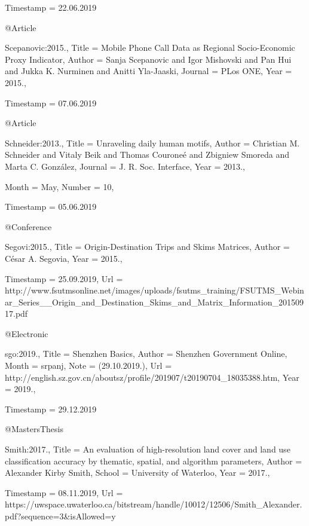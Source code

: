 {{{{  Timestamp                = {22.06.2019}
}

@Article{Scepanovic:2015.,
  Title                    = {{Mobile Phone Call Data as Regional Socio-Economic Proxy Indicator}},
  Author                   = {Sanja Scepanovic and Igor Mishovski and Pan Hui and Jukka K. Nurminen and Anitti Yla-Jaaski},
  Journal                  = {PLos ONE},
  Year                     = {2015.},

  Timestamp                = {07.06.2019}
}

@Article{Schneider:2013.,
  Title                    = {Unraveling daily human motifs},
  Author                   = {Christian M. Schneider and Vitaly Beik and Thomas Courone\'e and Zbigniew Smoreda and Marta C. Gonz\'alez},
  Journal                  = {J. R. Soc. Interface},
  Year                     = {2013.},

  Month                    = {May},
  Number                   = {10},

  Timestamp                = {05.06.2019}
}

@Conference{Segovi:2015.,
  Title                    = {{Origin-Destination Trips and Skims Matrices}},
  Author                   = {C\'esar A. Segovia},
  Year                     = {2015.},

  Timestamp                = {25.09.2019},
  Url                      = {http://www.fsutmsonline.net/images/uploads/fsutms_training/FSUTMS_Webinar_Series__Origin_and_Destination_Skims_and_Matrix_Information_20150917.pdf}
}

@Electronic{sgo:2019.,
  Title                    = {Shenzhen Basics},
  Author                   = {{Shenzhen Government Online}},
  Month                    = {srpanj},
  Note                     = {(29.10.2019.)},
  Url                      = {http://english.sz.gov.cn/aboutsz/profile/201907/t20190704_18035388.htm},
  Year                     = {2019.},

  Timestamp                = {29.12.2019}
}

@MastersThesis{Smith:2017.,
  Title                    = {An evaluation of high-resolution land cover and land use classification accuracy by thematic, spatial, and algorithm parameters},
  Author                   = {Alexander Kirby Smith},
  School                   = {University of Waterloo},
  Year                     = {2017.},

  Timestamp                = {08.11.2019},
  Url                      = {https://uwspace.uwaterloo.ca/bitstream/handle/10012/12506/Smith_Alexander.pdf?sequence=3&isAllowed=y}
}

}}}
